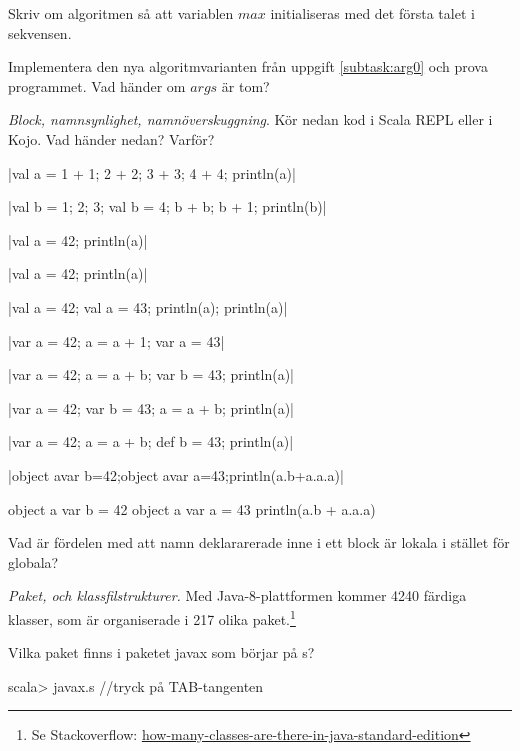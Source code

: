 \Subtask\Pen \label{subtask:arg0} Skriv om algoritmen så att variablen $max$ initialiseras med det första talet i sekvensen. 

\Subtask Implementera den nya algoritmvarianten från uppgift \ref{subtask:arg0} och prova programmet. Vad händer om $args$ är tom?

\Task \emph{Block, namnsynlighet, namnöverskuggning}. Kör nedan kod i Scala REPL eller i Kojo. Vad händer nedan? Varför?

\Subtask \code|val a = {1 + 1; 2 + 2; 3 + 3; 4 + 4}; println(a)|

\Subtask \code|val b = {1; 2; 3; {val b = 4; b + b; b + 1}}; println(b)|

\Subtask \code|{val a = 42; println(a)}|

\Subtask \code|{val a = 42}; println(a)|

\Subtask \code|{val a = 42; {val a = 43; println(a)}; println(a)}|

\Subtask \code|{var a = 42; {a = a + 1}; var a = 43}|

\Subtask \code|{var a = 42; {a = a + b; var b = 43}; println(a)}|

\Subtask \code|{var a = 42; {var b = 43; a = a + b}; println(a)}|

\Subtask \code|{var a = 42; {a = a + b; def b = 43}; println(a)}|

\Subtask \code|{object a{var b=42;object a{var a=43}};println(a.b+a.a.a)}|

\Subtask 

\begin{Code}
{
  object a {
    var b = 42
    object a {
      var a = 43
    }
  }
  println(a.b + a.a.a)
}
\end{Code}

\Subtask Vad är fördelen med att namn deklararerade inne i ett block är lokala i stället för globala?


\Task \label{task:package} \emph{Paket,  och klassfilstrukturer.} Med Java-8-plattformen kommer 4240 färdiga klasser, som är organiserade i 217 olika paket.\footnote{Se Stackoverflow: \href{http://stackoverflow.com/questions/3112882/how-many-classes-are-there-in-java-standard-edition}{how-many-classes-are-there-in-java-standard-edition}}

\Subtask Vilka paket finns i paketet javax som börjar på s?

\begin{REPLnonum}
scala> javax.s   //tryck på TAB-tangenten
\end{REPLnonum} 

